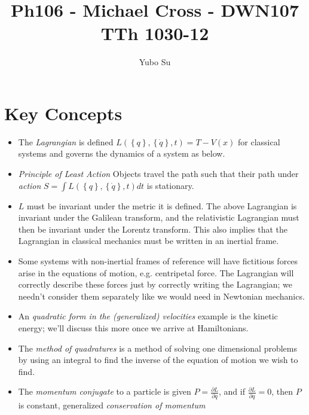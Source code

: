 \documentclass[10pt]{report}
\newcommand{\pd}[2]{\frac{\partial #1}{\partial#2}}
\begin{document}

\title{Ph106 - Michael Cross - DWN107 TTh 1030-12}
\author{Yubo Su}
\date{ }

\maketitle

\tableofcontents

\chapter{Key Concepts}

\begin{itemize}
    \item The \emph{Lagrangian} is defined $L\left( \left\{ q \right\},\left\{ \dot{q} \right\},t \right) = T-V(x)$ for classical systems and governs the dynamics of a system as below.
    \item \emph{Principle of Least Action} Objects travel the path such that their path under \emph{action} $S=\int L\left( \left\{ q \right\},\left\{ \dot{q} \right\},t \right) dt$ is stationary. 
    \item $L$ must be invariant under the metric it is defined. The above Lagrangian is invariant under the Galilean transform, and the relativistic Lagrangian must then be invariant under the Lorentz transform. This also implies that the Lagrangian in classical mechanics must be written in an inertial frame.
    \item Some systems with non-inertial frames of reference will have fictitious forces arise in the equations of motion, e.g. centripetal force. The Lagrangian will correctly describe these forces just by correctly writing the Lagrangian; we needn't consider them separately like we would need in Newtonian mechanics. 
    \item An \emph{quadratic form in the (generalized) velocities} example is the kinetic energy; we'll discuss this more once we arrive at Hamiltonians. 
    \item The \emph{method of quadratures} is a method of solving one dimensional problems by using an integral to find the inverse of the equation of motion we wish to find. 
    \item The \emph{momentum conjugate} to a particle is given $P=\pd{L}{\dot{q}}$, and if $\pd{L}{q} = 0$, then $P$ is constant, generalized \emph{conservation of momentum}

\end{itemize}
\end{document}
